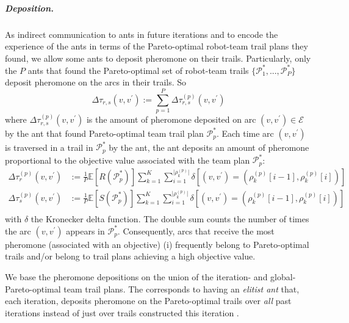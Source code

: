 \documentclass[11pt, oneside]{article}
\begin{document}
\subparagraph{Deposition.}
As indirect communication to ants in future iterations and to encode the experience of the ants in terms of the Pareto-optimal robot-team trail plans they found, we allow some ants to deposit pheromone on their trails.
Particularly, only the $P$ ants that found the Pareto-optimal set of robot-team trails $\{\mathcal{P}_1^*, ..., \mathcal{P}_P^*\}$ deposit pheromone on the arcs in their trails. So
\begin{equation}
	\Delta \tau_{r,s}(v, v^\prime):=\sum_{p=1}^P \Delta \tau_{r,s}^{(p)}(v, v^\prime)
\end{equation}
where $\Delta \tau_{r,s}^{(p)}(v, v^\prime)$ is the amount of pheromone deposited 
on arc $(v, v^\prime)\in \mathcal{E}$
by the ant that found Pareto-optimal team trail plan $\mathcal{P}^*_p$.
Each time arc $(v, v^\prime)$ is traversed in a trail in $\mathcal{P}^*_p$ by the ant, 
the ant deposits an amount of pheromone proportional to the objective value associated with the team plan $\mathcal{P}^*_p$:
\begin{align}
	\Delta \tau_r^{(p)}(v, v^\prime)& := 
	\frac{1}{P} \mathbb{E}[R(\mathcal{P}^*_p)] 
	\sum_{k=1}^K 
	\sum_{i=1}^{\lvert \rho_k^{(p)}\rvert}
	\delta \left[ 
		(v, v^\prime)=(\rho_k^{(p)}[i-1], \rho_k^{(p)}[i])
	\right] \\
	\Delta \tau_s^{(p)}(v, v^\prime)& := 
	\frac{1}{P} \mathbb{E}[S(\mathcal{P}^*_p)] 
	\sum_{k=1}^K 
	\sum_{i=1}^{\lvert \rho_k^{(p)}\rvert}
	\delta \left[ 
		(v, v^\prime)=(\rho_k^{(p)}[i-1], \rho_k^{(p)}[i])
	\right] \\
\end{align}
with $\delta$ the Kronecker delta function.
The double sum counts the number of times the arc $(v, v^\prime)$ appears in $\mathcal{P}^*_p$.
Consequently, arcs that receive the most pheromone (associated with an objective) (i) frequently belong to Pareto-optimal trails and/or belong to trail plans achieving a high objective value. 

We base the pheromone depositions on the union of the iteration- and global-Pareto-optimal team trail plans. The corresponds to having an \emph{elitist ant} that, each iteration, deposits pheromone on the Pareto-optimal trails over \emph{all} past iterations instead of just over trails constructed this iteration \cite{dorigo1996ant}.
\end{document}
